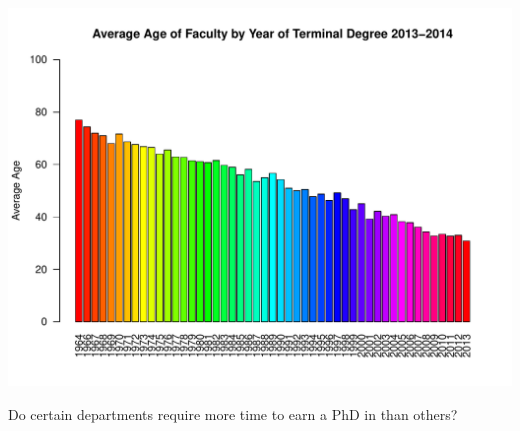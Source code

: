 \documentclass[12pt,a4paper]{article}\usepackage[]{graphicx}\usepackage[]{color}
\makeatletter
\def\maxwidth{ %
  \ifdim\Gin@nat@width>\linewidth
    \linewidth
  \else
    \Gin@nat@width
  \fi
}
\newenvironment{knitrout}{}{} %
\theoremstyle{definition}
\makeatother
\begin{document}
\begin{knitrout}
\includegraphics[width=\maxwidth]{figure/unnamed-chunk-12-10} 

\end{knitrout}

\bigskip
Do certain departments require more time to earn a PhD in than others?
\end{document}
